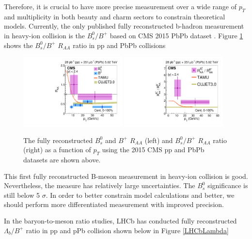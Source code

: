 
\clearpage

Therefore, it is crucial to have more precise measurement over a wide range of $p_T$ and multiplicity in both beauty and charm sectors to constrain theoretical models. Currently, the only published fully reconstructed b-hadron measurement in heavy-ion collision is the $B^0_s/B^+$ based on CMS 2015 PbPb dataset \cite{CMSBsBP2015}. Figure \ref{BsBP2015} shows the $B^0_s/B^+$ $R_{AA}$ ratio in pp and PbPb collisions

\begin{figure}[hbtp]
\begin{center}
\includegraphics[width=0.48\textwidth]{Figures/Chapter2/CMSBsBPRAA2015.pdf}
\includegraphics[width=0.48\textwidth]{Figures/Chapter2/CMSBsBP2015.pdf}
\caption{The fully reconstructed $B^0_s$ and $B^+$ $R_{AA}$ (left) and $B^0_s/B^+$ $R_{AA}$ ratio (right) as a function of $p_T$ using the 2015 CMS pp and PbPb datasets are shown above.}
\label{BsBP2015}
\end{center}
\end{figure}   


This first fully reconstructed B-meson measurement in heavy-ion collision is good. Nevertheless, the measure has relatively large uncertainties. The $B^0_s$ significance is still below 5 $\sigma$. In order to better constrain model calculations and better, we should perform more differentiated measurement with improved precision. 

In the baryon-to-meson ratio studies, LHCb has conducted fully reconstructed $\Lambda_b/B^+$ ratio in pp and pPb collision \cite{LHCbLambdaB} shown below in Figure \ref{LHCbLambda}


